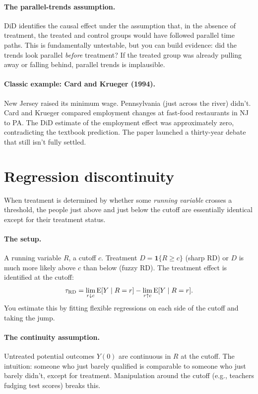 \paragraph{The parallel-trends assumption.} DiD identifies the causal effect under the assumption that, in the absence of treatment, the treated and control groups would have followed parallel time paths. This is fundamentally untestable, but you can build evidence: did the trends look parallel \emph{before} treatment? If the treated group was already pulling away or falling behind, parallel trends is implausible.

\paragraph{Classic example: Card and Krueger (1994).} New Jersey raised its minimum wage. Pennsylvania (just across the river) didn't. Card and Krueger compared employment changes at fast-food restaurants in NJ to PA. The DiD estimate of the employment effect was approximately zero, contradicting the textbook prediction. The paper launched a thirty-year debate that still isn't fully settled.

\section{Regression discontinuity}

When treatment is determined by whether some \emph{running variable} crosses a threshold, the people just above and just below the cutoff are essentially identical except for their treatment status.

\paragraph{The setup.} A running variable $R$, a cutoff $c$. Treatment $D = \mathbf{1}\{R \geq c\}$ (sharp RD) or $D$ is much more likely above $c$ than below (fuzzy RD). The treatment effect is identified at the cutoff:
\begin{equation}
  \tau_{\text{RD}} = \lim_{r \downarrow c} \operatorname{E}[Y \mid R = r] - \lim_{r \uparrow c} \operatorname{E}[Y \mid R = r].
  \label{eq:rd}
\end{equation}
You estimate this by fitting flexible regressions on each side of the cutoff and taking the jump.

\paragraph{The continuity assumption.} Untreated potential outcomes $Y(0)$ are continuous in $R$ at the cutoff. The intuition: someone who just barely qualified is comparable to someone who just barely didn't, except for treatment. Manipulation around the cutoff (e.g., teachers fudging test scores) breaks this.

